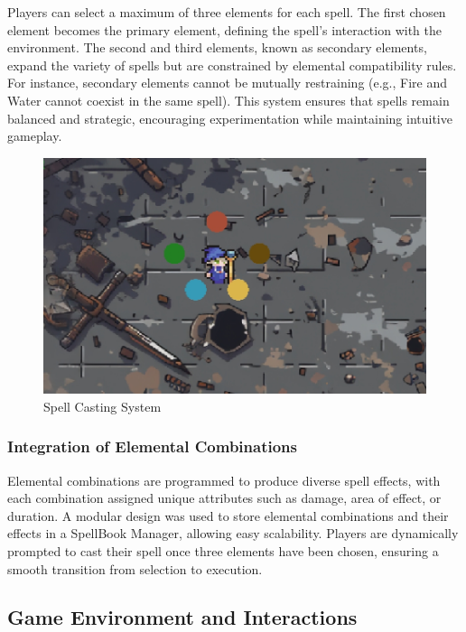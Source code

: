 \documentclass[10pt,twocolumn]{article}
\begin{document}
Players can select a maximum of three elements for each spell. The first chosen element becomes the primary element, defining the spell's interaction with the environment. The second and third elements, known as secondary elements, expand the variety of spells but are constrained by elemental compatibility rules. For instance, secondary elements cannot be mutually restraining (e.g., Fire and Water cannot coexist in the same spell). This system ensures that spells remain balanced and strategic, encouraging experimentation while maintaining intuitive gameplay.

\begin{figure}[h]
    \centering
    \includegraphics[width=\columnwidth]{figure1.png} %
    \caption{Spell Casting System}
    \label{fig:figure1} %
\end{figure}


\subsubsection{Integration of Elemental Combinations}
Elemental combinations are programmed to produce diverse spell effects, with each combination assigned unique attributes such as damage, area of effect, or duration. A modular design was used to store elemental combinations and their effects in a SpellBook Manager, allowing easy scalability. Players are dynamically prompted to cast their spell once three elements have been chosen, ensuring a smooth transition from selection to execution.

\subsection{Game Environment and Interactions}
\end{document}
